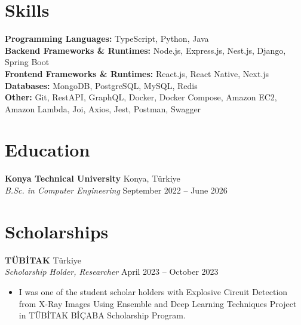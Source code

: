\documentclass[10pt,a4paper]{extarticle}
\begin{document}
\section{Skills}
\textbf{Programming Languages:} TypeScript, Python, Java\\
\textbf{Backend Frameworks \& Runtimes:} Node.js, Express.js, Nest.js, Django, Spring Boot\\
\textbf{Frontend Frameworks \& Runtimes:} React.js, React Native, Next.js\\
\textbf{Databases:} MongoDB, PostgreSQL, MySQL, Redis\\
\textbf{Other:} Git, RestAPI, GraphQL, Docker, Docker Compose, Amazon EC2, Amazon Lambda, Joi, Axios, Jest, Postman, Swagger
\section{Education}
\textbf{Konya Technical University} \hfill Konya, Türkiye\\
\textit{B.Sc. in Computer Engineering} \hfill September 2022 -- June 2026\\
\section{Scholarships}
\textbf{TÜBİTAK} \hfill Türkiye\\
\textit{Scholarship Holder, Researcher} \hfill April 2023 -- October 2023
\begin{itemize}[leftmargin=*,noitemsep,topsep=0pt]
    \item I was one of the student scholar holders with Explosive Circuit Detection from X-Ray Images Using Ensemble and Deep Learning Techniques Project in TÜBİTAK BİÇABA Scholarship Program.
\end{itemize}
\end{document}

